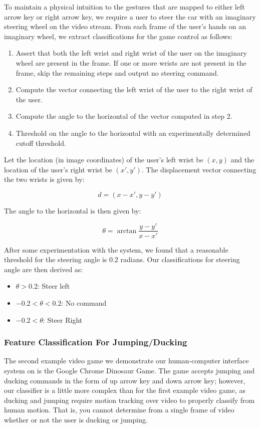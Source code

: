 \documentclass[10pt,twocolumn,letterpaper]{article}
\begin{document}
To maintain a physical intuition to the gestures that are mapped to either 
left arrow key or right arrow key, we require a user to steer the car with 
an imaginary steering wheel on the video stream. From each frame of the user's 
hands on an imaginary wheel, we extract classifications for the game control 
as follows:

\begin{enumerate}
    \item Assert that both the left wrist and right wrist of the user on the 
        imaginary wheel are present in the frame. If one or more wrists are 
        not present in the frame, skip the remaining steps and output no 
        steering command.
    \item Compute the vector connecting the left wrist of the user to the 
        right wrist of the user.
    \item Compute the angle to the horizontal of the vector computed in step 2.
    \item Threshold on the angle to the horizontal with an experimentally 
        determined cutoff threshold.
\end{enumerate}

Let the location (in image coordinates) of the user's left wrist be $(x,y)$ and 
the location of the user's right wrist be $(x', y')$. The displacement vector 
connecting the two wrists is given by:

$$d = (x - x', y - y')$$

The angle to the horizontal is then given by:

$$\theta = \arctan{\frac{y-y'}{x-x'}}$$

After some experimentation with the system, we found that a reasonable threshold 
for the steering angle is $0.2$ radians. Our classifications for steering angle 
are then derived as:

\begin{itemize}
    \item $\theta > 0.2$: Steer left
    \item $-0.2 < \theta < 0.2$: No command
    \item $-0.2 < \theta$: Steer Right
\end{itemize}

\subsubsection{Feature Classification For Jumping/Ducking} 
The second example video game we demonstrate our human-computer interface system 
on is the Google Chrome Dinosaur Game. The game accepts jumping and ducking commands 
in the form of up arrow key and down arrow key; however, our classifier is a 
little more complex than for the first example video game, as ducking and jumping 
require motion tracking over video to properly classify from human motion. That is, 
you cannot determine from a single frame of video whether or not the user is 
ducking or jumping.\\
\end{document}
